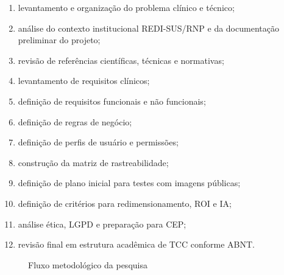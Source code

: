 \documentclass[
    12pt,
    oneside,
    a4paper,
    chapter=TITLE,
    brazil,
    sumario=tradicional,
    hidelinks
]{abntex2}
\begin{document}
\begin{enumerate}
    \item levantamento e organização do problema clínico e técnico;
    \item análise do contexto institucional REDI-SUS/RNP e da documentação preliminar do projeto;
    \item revisão de referências científicas, técnicas e normativas;
    \item levantamento de requisitos clínicos;
    \item definição de requisitos funcionais e não funcionais;
    \item definição de regras de negócio;
    \item definição de perfis de usuário e permissões;
    \item construção da matriz de rastreabilidade;
    \item definição de plano inicial para testes com imagens públicas;
    \item definição de critérios para redimensionamento, ROI e IA;
    \item análise ética, LGPD e preparação para CEP;
    \item revisão final em estrutura acadêmica de TCC conforme ABNT.
\end{enumerate}

\begin{figure}[htbp]
    \centering
    \caption{\label{fig:fluxo-metodologico}Fluxo metodológico da pesquisa}
\end{figure}
\end{document}
